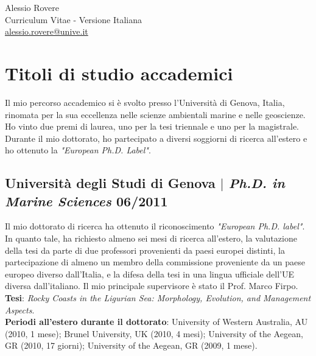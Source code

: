 \documentclass[11pt]{article}
\begin{document}
\begin{center}
    {\fontsize{36}{36}\selectfont\interthin Alessio \interheavy Rovere} \\ \bigskip
    {\fontsize{14}{14}\selectfont\interthin Curriculum Vitae - Versione Italiana}\\ \bigskip
    {\color{icnclr}\faEnvelope[regular]} \href{mailto:alessio.rovere@unive.it}{alessio.rovere@unive.it}
\end{center}

\section{Titoli di studio accademici}
{\normalfont Il mio percorso accademico si è svolto presso l'Università di Genova, Italia, rinomata per la sua eccellenza nelle scienze ambientali marine e nelle geoscienze. Ho vinto due premi di laurea, uno per la tesi triennale e uno per la magistrale. Durante il mio dottorato, ho partecipato a diversi soggiorni di ricerca all'estero e ho ottenuto la \textit{"European Ph.D. Label"}.} \\

\bigskip
\subsection{Università degli Studi di Genova $|$ {\normalfont\textit{Ph.D. in Marine Sciences}} \hfill 06/2011}
{\footnotesize Il mio dottorato di ricerca ha ottenuto il riconoscimento \textit{"European Ph.D. label"}. In quanto tale, ha richiesto almeno sei mesi di ricerca all'estero, la valutazione della tesi da parte di due professori provenienti da paesi europei distinti, la partecipazione di almeno un membro della commissione proveniente da un paese europeo diverso dall'Italia, e la difesa della tesi in una lingua ufficiale dell'UE diversa dall'italiano. Il mio principale supervisore è stato il Prof. Marco Firpo. \\
\textbf{Tesi}: \textit{Rocky Coasts in the Ligurian Sea: Morphology, Evolution, and Management Aspects}.\\ 
\textbf{Periodi all'estero durante il dottorato}: University of Western Australia, AU (2010, 1 mese); Brunel University, UK (2010, 4 mesi); University of the Aegean, GR (2010, 17 giorni); University of the Aegean, GR (2009, 1 mese).}
\bigskip
\end{document}
